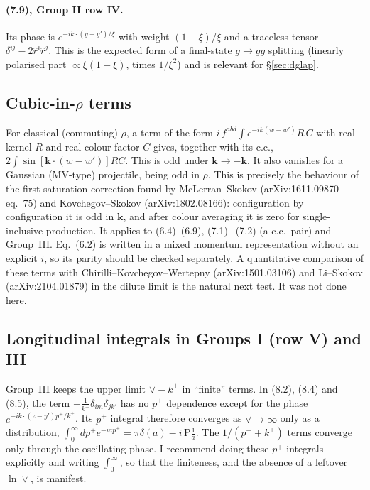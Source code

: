 \documentclass[10pt]{article}
\begin{document}
\paragraph{(7.9), Group II row IV.} Its phase is $e^{-ik\cdot(y-y')/\xi}$ with weight $(1-\xi)/\xi$ and a traceless tensor
$\delta^{ij}-2\hat r^i\hat r^j$. This is the expected form of a final-state $g\to gg$ splitting (linearly polarised part $\propto\xi(1-\xi)$, times
$1/\xi^2$) and is relevant for \S\ref{sec:dglap}.

\subsection{Cubic-in-$\rho$ terms}\label{sec:cubic}
For classical (commuting) $\rho$, a term of the form $i\,f^{abd}\!\int e^{-ik(w-w')}R\,C$ with real kernel $R$ and real colour factor $C$ gives,
together with its c.c., $2\int\sin[\mathbf k\cdot(w-w')]RC$. This is odd under $\mathbf k\to-\mathbf k$. It also vanishes for a Gaussian (MV-type) projectile,
being odd in $\rho$. This is precisely the behaviour of the first saturation correction found by McLerran--Skokov (arXiv:1611.09870 eq.~75) and
Kovchegov--Skokov (arXiv:1802.08166): configuration by configuration it is odd in $\mathbf k$, and after colour averaging it is zero for single-inclusive production.
It applies to (6.4)--(6.9), (7.1)+(7.2) (a c.c.\ pair) and Group~III. Eq.~(6.2) is written in a mixed momentum representation without an explicit $i$, so its parity
should be checked separately. A quantitative comparison of these terms with Chirilli--Kovchegov--Wertepny (arXiv:1501.03106) and Li--Skokov
(arXiv:2104.01879) in the dilute limit is the natural next test. It was not done here.

\subsection{Longitudinal integrals in Groups I (row V) and III}
Group~III keeps the upper limit $\vee-k^+$ in ``finite'' terms. In (8.2), (8.4) and (8.5), the term $-\frac{1}{k^+}\delta_{im}\delta_{jk'}$ has
no $p^+$ dependence except for the phase $e^{-ik\cdot(z-y')p^+/k^+}$. Its $p^+$ integral therefore converges as $\vee\to\infty$ only as a distribution,
$\int_0^\infty dp^+e^{-iap^+}=\pi\delta(a)-i\,\mathrm{P}\frac{1}{a}$. The $1/(p^+ + k^+)$ terms converge only through the oscillating phase. I recommend doing these $p^+$
integrals explicitly and writing $\int_0^\infty$, so that the finiteness, and the absence of a leftover $\ln\vee$, is manifest.
\end{document}
